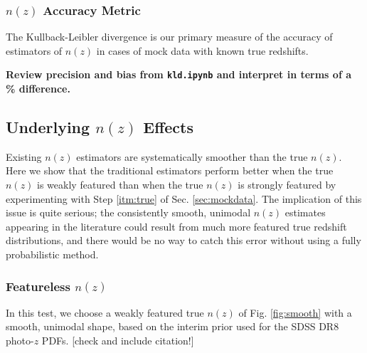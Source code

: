 \documentclass[iop]{emulateapj}
\begin{document}
\subsubsection{$n(z)$ Accuracy Metric}
\label{sec:accuracy}

The Kullback-Leibler divergence is our primary measure of the accuracy of 
estimators of $n(z)$ in cases of mock data with known true redshifts.

\textbf{Review precision and bias from \texttt{kld.ipynb} and interpret in 
terms of a \% difference.}

\subsection{Underlying $n(z)$ Effects}
\label{sec:truth}

Existing $n(z)$ estimators are systematically smoother than the true $n(z)$.  
Here we show that the traditional estimators perform better when the true 
$n(z)$ is weakly featured than when the true $n(z)$ is strongly featured by 
experimenting with Step \ref{itm:true} of Sec. \ref{sec:mockdata}.  The 
implication of this issue is quite serious; the consistently smooth, unimodal 
$n(z)$ estimates appearing in the literature could result from much more 
featured true redshift distributions, and there would be no way to catch this 
error without using a fully probabilistic method.

\subsubsection{Featureless $n(z)$}
\label{sec:smooth}

In this test, we choose a weakly featured true $n(z)$ of Fig. \ref{fig:smooth} 
with a smooth, unimodal shape, based on the interim prior used for the SDSS DR8 
photo-$z$ PDFs.  [check and include citation!]
\end{document}
